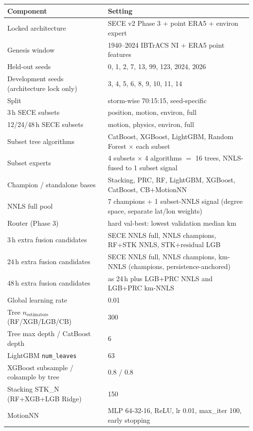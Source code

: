 \documentclass{ametsocv6.1}
\begin{document}
\begin{table}[ht]
\centering
\begin{tabular}{@{}p{}p{}@{}}
\toprule
Component & Setting \\
\midrule
Locked architecture & SECE v2 Phase 3 + point ERA5 + environ expert \\
Genesis window & 1940--2024 IBTrACS NI + ERA5 point features \\
Held-out seeds & 0, 1, 2, 7, 13, 99, 123, 2024, 2026 \\
Development seeds (architecture lock only) & 3, 4, 5, 6, 8, 9, 10, 11, 14 \\
Split & storm-wise 70:15:15, seed-specific \\
3\,h SECE subsets & position, motion, environ, full \\
12/24/48\,h SECE subsets & motion, physics, environ, full \\
Subset tree algorithms & CatBoost, XGBoost, LightGBM, Random Forest $\times$ each subset \\
Subset experts & 4 subsets $\times$ 4 algorithms $=$ 16 trees, NNLS-fused to 1 subset signal \\
Champion / standalone bases & Stacking, PRC, RF, LightGBM, XGBoost, CatBoost, CB+MotionNN \\
NNLS full pool & 7 champions + 1 subset-NNLS signal (degree space, separate lat/lon weights) \\
Router (Phase 3) & hard val-best: lowest validation median km \\
3\,h extra fusion candidates & SECE NNLS full, NNLS champions, RF+STK NNLS, STK+residual LGB \\
24\,h extra fusion candidates & SECE NNLS full, NNLS champions, km-NNLS (champions, persistence-anchored) \\
48\,h extra fusion candidates & as 24\,h plus LGB+PRC NNLS and LGB+PRC km-NNLS \\
Global learning rate & 0.01 \\
Tree $n_{\mathrm{estimators}}$ (RF/XGB/LGB/CB) & 300 \\
Tree max depth / CatBoost depth & 6 \\
LightGBM \texttt{num\_leaves} & 63 \\
XGBoost subsample / colsample by tree & 0.8 / 0.8 \\
Stacking STK\_N (RF+XGB+LGB Ridge) & 150 \\
MotionNN & MLP 64-32-16, ReLU, lr 0.01, max\_iter 100, early stopping \\

\end{tabular}
\end{table}
\end{document}
